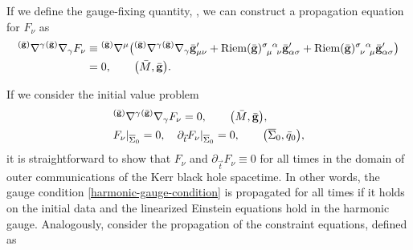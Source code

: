 \documentclass[pdftex]{sigma}
\def\ptl{\partial}%
\def\olin#1{\overline{#1}{}}%
\def\grad{{\nabla}}%
\newcommand{\leftexp}[2]{{\vphantom{#2}}^{#1}{#2}}
\def \gm{\gamma}
\def \a{\alpha}
\renewcommand{\gg}{{\bf g}}
\newcommand{\bgg}{{\bar{\bf g}}}
\newcommand{\tgg}{{\tilde{\bf g}}}
\renewcommand{\a}{\alpha}
\numberwithin{equation}{section}
\begin{document}
If we define the gauge-fixing quantity, \smash{$F_\nu = \leftexp{(\bgg)}{\grad}^\mu \tgg'_{ \mu \nu}$}, we can construct a propagation equation for $F_\nu$ as
\begin{align*}
\leftexp{(\bgg)}{\grad}^\gm \leftexp{(\bgg)}{\grad}_\gm F_\nu &{}\equiv \leftexp{(\bgg)}{\grad}^ \mu
\bigl(\leftexp{(\bgg)}{\grad}^\gm \leftexp{(\bar{\gg})}{\grad}_\gm \bgg'_{\mu \nu} + {\rm Riem}(\bgg)^{\sigma \,\,\,\a}_{\,\,\,\mu\,\,\,\nu} \bgg'_{\a \sigma} + {\rm Riem}(\bgg)^{\sigma \,\,\,\a}_{\,\,\,\nu\,\,\,\mu} \bgg'_{\a \sigma}\bigr) \\
&{}= 0, \qquad \bigl(\bar{M}, \bgg\bigr).
\end{align*}

If we consider the initial value problem
\begin{align*}
&\leftexp{(\bgg)}{\grad}^\gm \leftexp{(\bgg)}{\grad}_\gm F_\nu= 0, \qquad \bigl(\bar{M}, \bgg\bigr), \\
&F_\nu \vert_{\olin{\Sigma}_0} =0, \quad \ptl_{\vec{t}} F_\nu \vert_{\olin{\Sigma}_0} =0, \qquad \bigl(\olin{\Sigma}_0, \bar{q}_0\bigr),
\end{align*}
it is straightforward to show that $F_\nu$ and $\ptl_{\vec{t}} F_\nu \equiv 0$ for all times in the domain of outer communications of the Kerr black hole spacetime. In other words, the gauge condition \eqref{harmonic-gauge-condition} is propagated for all times if it holds on the initial data and the linearized Einstein equations hold in the harmonic gauge. Analogously, consider the propagation of the constraint equations, defined as
\end{document}
